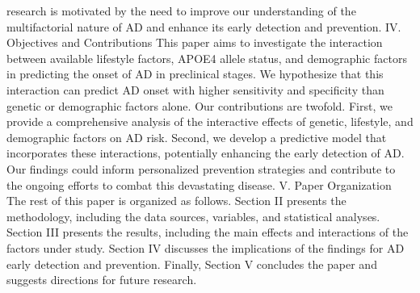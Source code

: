 \documentclass[conference]{IEEEtran}
\begin{document}
research is motivated by the need to improve our understanding of the multifactorial nature of AD and enhance its early detection and prevention. IV. Objectives and Contributions This paper aims to investigate the interaction between available lifestyle factors, APOE4 allele status, and demographic factors in predicting the onset of AD in preclinical stages. We hypothesize that this interaction can predict AD onset with higher sensitivity and specificity than genetic or demographic factors alone. Our contributions are twofold. First, we provide a comprehensive analysis of the interactive effects of genetic, lifestyle, and demographic factors on AD risk. Second, we develop a predictive model that incorporates these interactions, potentially enhancing the early detection of AD. Our findings could inform personalized prevention strategies and contribute to the ongoing efforts to combat this devastating disease. V. Paper Organization The rest of this paper is organized as follows. Section II presents the methodology, including the data sources, variables, and statistical analyses. Section III presents the results, including the main effects and interactions of the factors under study. Section IV discusses the implications of the findings for AD early detection and prevention. Finally, Section V concludes the paper and suggests directions for future research.
\end{document}
